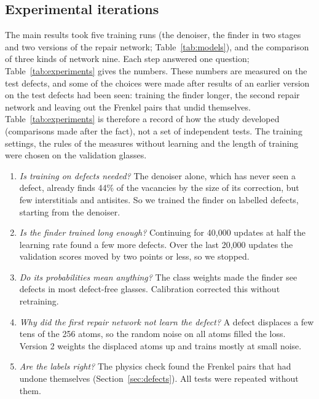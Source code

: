 \documentclass[10pt]{article}
\newif\ifablations
\newif\iffinders
\begin{document}
\subsection{Experimental iterations}
\label{sec:iterations}

The main results took five training runs (the denoiser, the finder in two stages and two versions of the repair network; Table~\ref{tab:models})\ifablations, the ablations 18 short ones\fi\iffinders, and the comparison of three kinds of network nine\fi. Each step answered one question; Table~\ref{tab:experiments} gives the numbers. These numbers are measured on the test defects, and some of the choices were made after results of an earlier version on the test defects had been seen: training the finder longer, the second repair network and leaving out the Frenkel pairs that undid themselves. Table~\ref{tab:experiments} is therefore a record of how the study developed (comparisons made after the fact), not a set of independent tests. The training settings, the rules of the measures without learning and the length of training were chosen on the validation glasses.
\begin{enumerate}
\item \emph{Is training on defects needed?} The denoiser alone, which has never seen a defect, already finds 44\% of the vacancies by the size of its correction, but few interstitials and antisites. So we trained the finder on labelled defects, starting from the denoiser.
\item \emph{Is the finder trained long enough?} Continuing for 40,000 updates at half the learning rate found a few more defects. Over the last 20,000 updates the validation scores moved by two points or less, so we stopped.
\item \emph{Do its probabilities mean anything?} The class weights made the finder see defects in most defect-free glasses. Calibration corrected this without retraining.
\item \emph{Why did the first repair network not learn the defect?} A defect displaces a few tens of the 256 atoms, so the random noise on all atoms filled the loss. Version 2 weights the displaced atoms up and trains mostly at small noise.
\item \emph{Are the labels right?} The physics check found the Frenkel pairs that had undone themselves (Section~\ref{sec:defects}). All tests were repeated without them.
\ifablations
\item \emph{Which design choices matter?} Short runs change one setting at a time: the starting weights, the number of layers, the class weights and the cleaned training set. Each of the six settings was trained three times with different random numbers (Section~\ref{sec:ablations}).
\fi
\iffinders
\item \emph{Is the training stable?} Prof.\ Dabo warned that networks of the EGNN kind can be unstable in training. We recorded the loss and the gradient at every update of the repeated runs (Section~\ref{sec:stability}).
\item \emph{Is a graph network the right kind of network?} We trained a transformer and a CNN as finders, in exactly the same way as the EGNN (Section~\ref{sec:finders}).
\fi
\end{enumerate}
\end{document}
